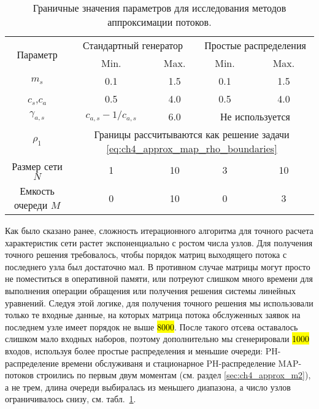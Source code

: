 \begin{table}[h]
    \caption{\label{tab:ch4_results_approx_input_range} Граничные значения параметров для исследования методов аппроксимации потоков.}
    \begin{tabular}{ccccc}
        \toprule
        \multirow{2}{*}{Параметр}
          &\multicolumn{2}{c}{Стандартный генератор}&\multicolumn{2}{c}{Простые распределения}\\
                        &Min.   &Max.    &Min.   &Max.\\
        \midrule
        $m_s$           &0.1       &1.5        &0.1        &1.5\\
        $c_s$,$c_a$     &0.5       &4.0        &0.5        &4.0\\
        $\gamma_{a,s}$  &$c_{a,s} - 1/c_{a,s}$ &6.0    &\multicolumn{2}{c}{Не используется}\\
        $\rho_1$        &\multicolumn{4}{c}{Границы рассчитываются как решение задачи \eqref{eq:ch4_approx_map_rho_boundaries}}\\
        Размер сети $N$ &1          &10        &3           &10\\
        Емкость очереди $M$ &0      &10        &0           &3\\
        \bottomrule
    \end{tabular}
\end{table}


Как было сказано ранее, сложность итерационного алгоритма для точного расчета характеристик сети растет экспоненциально с ростом числа узлов. Для получения точного решения требовалось, чтобы порядок матриц выходящего потока с последнего узла был достаточно мал. В противном случае матрицы могут просто не поместиться в оперативной памяти, или потреуют слишком много времени для выполнения операции обращения или получения решения системы линейных уравнений. Следуя этой логике, для получения точного решения мы использовали только те входные данные, на которых матрица потока обслуженных заявок на последнем узле имеет порядок не выше \hl{8000}. После такого отсева оставалось слишком мало входных наборов, поэтому дополнительно мы сгенерировали \hl{1000} входов, используя более простые распределения и меньшие очереди: PH-распределение времени обслуживаня и стационарное PH-распределение MAP-потоков строились по первым двум моментам (см. раздел \ref{sec:ch4_approx_m2}), а не трем, длина очереди выбиралась из меньшего диапазона, а число узлов ограничивалось снизу, см. табл.~\ref{tab:ch4_results_approx_input_range}.

